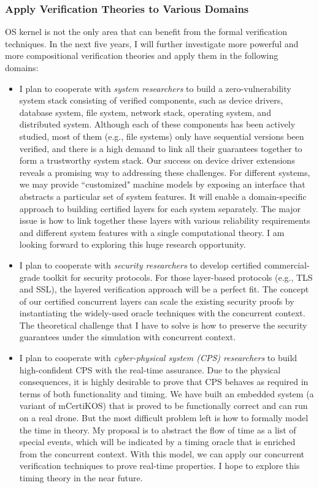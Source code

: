 \documentclass[a4paper, 10pt]{article}
\begin{document}
\begin{small}
\subsubsection*{\small Apply Verification Theories to Various Domains}
OS kernel is not the only area that can benefit
from the formal verification techniques. In the next five years, I will further investigate more powerful and more compositional  verification theories
and apply them
in the following domains: 
\begin{itemize}
\item I plan to cooperate with \emph{system researchers} to build a zero-vulnerability system stack consisting of verified components, such as device drivers,
database system, file system, network stack, operating system,
 and distributed system.
 Although each of these components has been actively studied,
 most of them  (e.g., file systems) only have sequential versions been verified, and there is a high demand to 
link all their guarantees together
to form  a  trustworthy system stack. Our success on  device driver extensions
reveals a promising way to addressing these challenges.
For different systems, we may
provide ``customized" machine models
by exposing an  interface that abstracts  a particular set of system features.
It will enable a domain-specific approach to building certified layers for each system separately.
The major issue is how to link together these layers with various reliability requirements
and different system features with a single computational theory.
I am looking forward to exploring this huge research opportunity.


\item I plan to cooperate with \emph{security researchers}
to  develop certified 
commercial-grade toolkit for security
protocols. 
For those layer-based protocols (e.g., TLS and SSL), the layered verification approach will be a perfect fit.
The concept of our certified concurrent  layers can scale the existing security proofs by instantiating the widely-used oracle techniques
with the concurrent context. The theoretical challenge that I have to solve is
how to preserve the security guarantees under the simulation with concurrent context.

\item I plan to cooperate with
\emph{cyber-physical system (CPS) researchers} to build
high-confident CPS with the real-time assurance.
Due to the physical consequences, it is highly desirable to
prove that CPS behaves as required in terms of both functionality and timing. 
We have built an embedded system (a variant of mCertiKOS) that is proved to be functionally correct and can run on a real drone. But the most difficult problem left is how to formally
model the time in theory. My proposal is to abstract the flow of time  as a list of special events, which will be indicated by a timing oracle that is enriched from the concurrent context.
With this model, we can apply 
our concurrent verification techniques to prove
 real-time properties. I hope to explore this timing theory in the near future.
 

\end{itemize}
\end{small}
\end{document}
